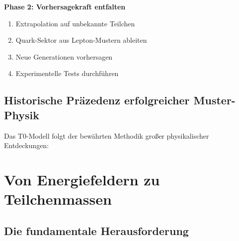 	\textbf{Phase 2: Vorhersagekraft entfalten}
	\begin{enumerate}
		\item Extrapolation auf unbekannte Teilchen
		\item Quark-Sektor aus Lepton-Mustern ableiten
		\item Neue Generationen vorhersagen
		\item Experimentelle Tests durchführen
	\end{enumerate}
	
	\subsection{Historische Präzedenz erfolgreicher Muster-Physik}
	\label{subsec:historische_praezedenz}
	
	Das T0-Modell folgt der bewährten Methodik großer physikalischer Entdeckungen:
	
	\begin{table}[H]
		\centering
		\caption{Historische Präzedenz der Muster-Physik}
		\label{tab:historische_praezedenz}
	\end{table}
	
	\section{Von Energiefeldern zu Teilchenmassen}
	\label{sec:energy_fields_to_masses}
	
	\subsection{Die fundamentale Herausforderung}
	\label{subsec:fundamental_challenge}
	

